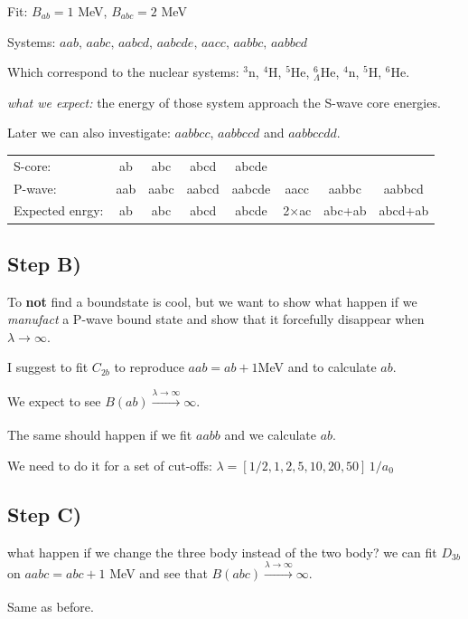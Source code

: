\documentclass[aps,prd
,tightenlines,letterpaper,
nofootinbib]{revtex4-1}
\begin{document}
Fit: $B_{ab}=1$ MeV, $B_{abc}=2$ MeV

Systems: $aab,\, aabc,\, aabcd,\, aabcde,\, aacc,\, aabbc,\, aabbcd$

Which correspond to the nuclear systems: $^3$n, $^4$H, $^5$He, $^6_\Lambda$He, $^4$n, $^5$H, $^6$He.

\textit{what we expect:}  the energy of those system approach the S-wave core energies.

Later we can also investigate: $aabbcc$, $aabbccd$ and $aabbccdd$.

\begin{center}
\begin{tabular}{ l ccccccc }
 S-core: & ab &abc & abcd & abcde&&& \\
 P-wave: & aab & aabc & aabcd & aabcde & aacc & aabbc & aabbcd \\ 
 Expected enrgy: & ab & abc & abcd & abcde & 2$\times$ac & abc+ab & abcd+ab\\
\end{tabular}
\end{center}

\subsection{Step B)}

To \textbf{not} find a boundstate is cool, but we want to show what happen if we \textit{manufact} a P-wave bound state and show that it forcefully disappear when $\lambda\rightarrow\infty$.

I suggest to fit $C_{2b}$ to reproduce $aab=ab+1$MeV and to calculate $ab$.

We expect to see $B(ab)\xrightarrow[]{\lambda\rightarrow\infty}\infty$.

The same should happen if we fit $aabb$ and we calculate $ab$.

We need to do it for a set of cut-offs: $\lambda = [1/2, 1,2,5,10,20,50]\, 1/a_0$


\subsection{Step C)}

what happen if we change the three body instead of the two body? we can fit $D_{3b}$ on $aabc=abc+1$ MeV and see that $B(abc)\xrightarrow[]{\lambda\rightarrow\infty}\infty$.

Same as before.
\end{document}
